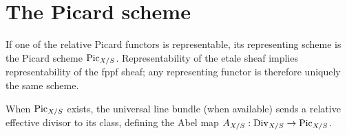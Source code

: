 \section{The Picard scheme}\label{kps-sec-scheme}

\begin{definition}\label{kps-def-picard-scheme}
If one of the relative Picard functors is representable, its representing
scheme is the Picard scheme $\operatorname{Pic}_{X/S}$. Representability of the etale
sheaf implies representability of the fppf sheaf; any representing functor is
therefore uniquely the same scheme.
\end{definition}

\begin{definition}\label{kps-def-abel-map}
When $\operatorname{Pic}_{X/S}$ exists, the universal line bundle (when available) sends a
relative effective divisor to its class, defining the Abel map
$A_{X/S}:\operatorname{Div}_{X/S}\to\operatorname{Pic}_{X/S}$.
\end{definition}

